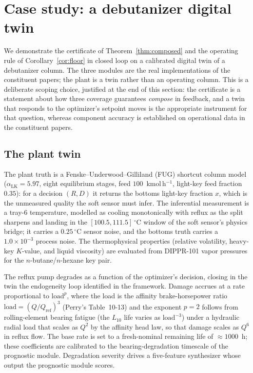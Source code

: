 \section{Case study: a debutanizer digital twin}
\label{sec:case}

We demonstrate the certificate of Theorem~\ref{thm:composed} and the operating
rule of Corollary~\ref{cor:floor} in closed loop on a calibrated digital twin of a
debutanizer column. The three modules are the real implementations of the
constituent papers; the plant is a twin rather than an operating column. This is
a deliberate scoping choice, justified at the end of this section: the certificate
is a statement about how three coverage guarantees \emph{compose} in feedback, and
a twin that responds to the optimizer's setpoint moves is the appropriate
instrument for that question, whereas component accuracy is established on
operational data in the constituent papers.

\subsection{The plant twin}
\label{sec:twin}

The plant truth is a Fenske--Underwood--Gilliland (FUG) shortcut column model
($\alpha_{\mathrm{LK}}=5.97$, eight equilibrium stages, feed $100$~kmol\,h$^{-1}$,
light-key feed fraction $0.35$): for a decision $(R,D)$ it returns the bottoms
light-key fraction $x$, which is the unmeasured quality the soft sensor must
infer. The inferential measurement is a tray-6 temperature, modelled as cooling
monotonically with reflux as the split sharpens and landing in the
$[100.5, 111.5]\,^\circ$C window of the soft sensor's physics bridge; it carries a
$0.25\,^\circ$C sensor noise, and the bottoms truth carries a
$1.0\times10^{-3}$ process noise. The thermophysical properties (relative
volatility, heavy-key $K$-value, and liquid viscosity) are evaluated from
DIPPR-101 vapor pressures for the $n$-butane/$n$-hexane key pair.

The reflux pump degrades as a function of the optimizer's decision, closing in the
twin the endogeneity loop identified in the framework. Damage accrues at a rate
proportional to $\mathrm{load}^{p}$, where the load is the affinity brake-horsepower
ratio $\mathrm{load} = (Q/Q_{\mathrm{ref}})^{3}$ (Perry's Table~10-13) and the
exponent $p=2$ follows from rolling-element bearing fatigue (the $L_{10}$ life
varies as $\mathrm{load}^{-3}$) under a hydraulic radial load that scales as $Q^{2}$
by the affinity head law, so that damage scales as $Q^{6}$ in reflux flow. The base
rate is set to a fresh-nominal remaining life of $\approx\!1000$~h; these
coefficients are calibrated to the bearing-degradation timescale of the prognostic
module. Degradation severity drives a five-feature synthesizer whose output the
prognostic module scores.

